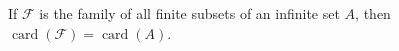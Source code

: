If $\mathcal{F}$ is the family of all finite subsets of an infinite set $A$, then $\operatorname{card}(\mathcal{F}) = \operatorname{card}(A)$.
